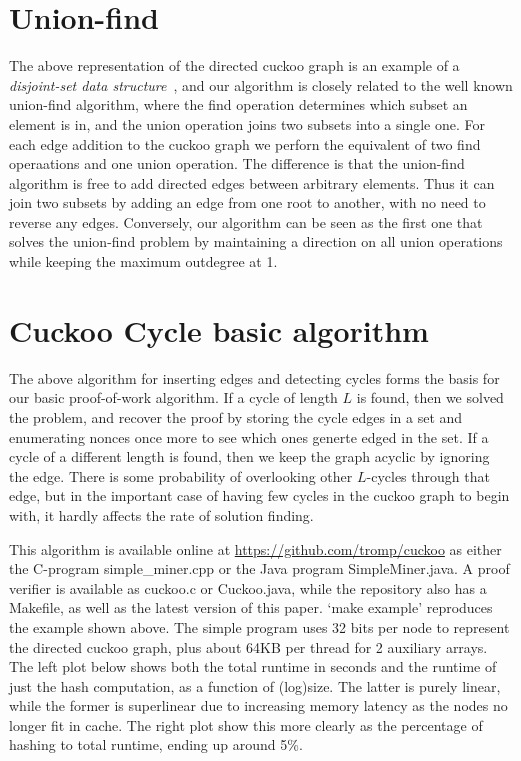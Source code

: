 \documentclass[11pt, oneside]{article}
\begin{document}
\section{Union-find}
The above representation of the directed cuckoo graph is an example of
a {\em disjoint-set data structure}~\cite{wikidsds2014}, and our algorithm is
closely related to the well known union-find algorithm, where the find operation
determines which subset an element is in, and the union operation joins two subsets
into a single one. For each edge addition to the cuckoo graph we perforn the equivalent
of two find operaations and one union operation.
The difference is that the union-find algorithm is free to add
directed edges between arbitrary elements. Thus it can join two subsets by adding an edge
from one root to another, with no need to reverse any edges. Conversely, our algorithm
can be seen as the first one that solves the union-find problem by maintaining
a direction on all union operations while keeping the maximum outdegree at 1.

\section{Cuckoo Cycle basic algorithm}
The above algorithm for inserting edges and detecting cycles forms the basis
for our basic proof-of-work algorithm.
If a cycle of length $L$ is found, then we solved the problem, and recover the proof
by storing the cycle edges in a set and enumerating nonces once more to see which ones
generte edged in the set.
If a cycle of a different length is found, then we keep the graph acyclic by ignoring the edge.
There is some probability of overlooking other $L$-cycles
through that edge, but in the important case of having few cycles
in the cuckoo graph to begin with, it hardly affects the rate of solution finding.

This algorithm is available online at \url{https://github.com/tromp/cuckoo}
as either the C-program simple\_miner.cpp or the Java program SimpleMiner.java.
A proof verifier is available as cuckoo.c or Cuckoo.java, while the repository
also has a Makefile, as well as the latest version of this paper.
`make example' reproduces the example shown above.
The simple program uses 32 bits per node to represent the directed cuckoo graph,
plus about 64KB per thread for 2 auxiliary arrays.
The left plot below shows both the total runtime in seconds and the runtime of just
the hash computation, as a function of (log)size. The latter is purely
linear, while the former is superlinear due to increasing memory latency
as the nodes no longer fit in cache. The right plot show this more clearly
as the percentage of hashing to total runtime, ending up around 5\%.
\end{document}
